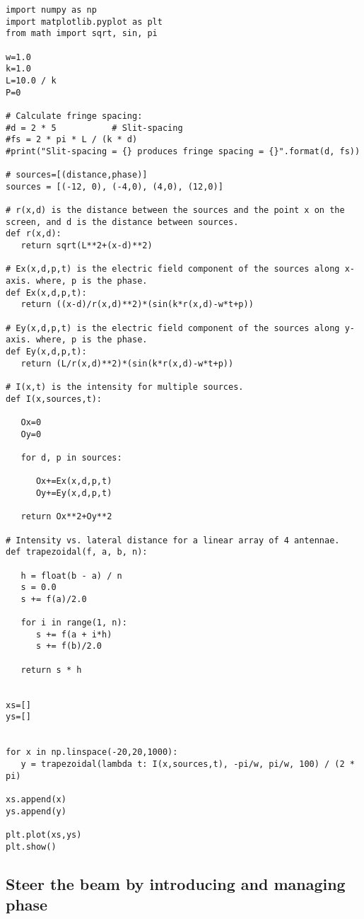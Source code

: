 \begin{Verbatim}[fontsize=\small,baselinestretch=0.9]
import numpy as np
import matplotlib.pyplot as plt
from math import sqrt, sin, pi

w=1.0
k=1.0
L=10.0 / k
P=0

# Calculate fringe spacing:
#d = 2 * 5           # Slit-spacing
#fs = 2 * pi * L / (k * d)
#print("Slit-spacing = {} produces fringe spacing = {}".format(d, fs))

# sources=[(distance,phase)]
sources = [(-12, 0), (-4,0), (4,0), (12,0)]

# r(x,d) is the distance between the sources and the point x on the screen, and d is the distance between sources.
def r(x,d):
   return sqrt(L**2+(x-d)**2)

# Ex(x,d,p,t) is the electric field component of the sources along x-axis. where, p is the phase.
def Ex(x,d,p,t):
   return ((x-d)/r(x,d)**2)*(sin(k*r(x,d)-w*t+p))

# Ey(x,d,p,t) is the electric field component of the sources along y-axis. where, p is the phase.
def Ey(x,d,p,t):
   return (L/r(x,d)**2)*(sin(k*r(x,d)-w*t+p))

# I(x,t) is the intensity for multiple sources.
def I(x,sources,t):

   Ox=0
   Oy=0

   for d, p in sources:

      Ox+=Ex(x,d,p,t)
      Oy+=Ey(x,d,p,t)

   return Ox**2+Oy**2

# Intensity vs. lateral distance for a linear array of 4 antennae.
def trapezoidal(f, a, b, n):

   h = float(b - a) / n
   s = 0.0
   s += f(a)/2.0

   for i in range(1, n):
      s += f(a + i*h)
      s += f(b)/2.0

   return s * h


xs=[]
ys=[]


for x in np.linspace(-20,20,1000):
   y = trapezoidal(lambda t: I(x,sources,t), -pi/w, pi/w, 100) / (2 * pi)

xs.append(x)
ys.append(y)

plt.plot(xs,ys)
plt.show()   
\end{Verbatim}

\subsection{Steer the beam by introducing and managing phase}

